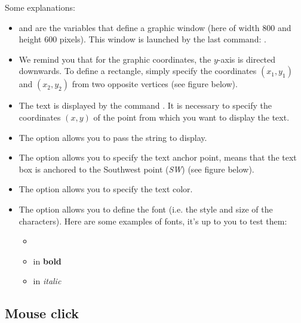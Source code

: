 \documentclass[11pt,class=report,crop=false]{standalone}
\begin{document}
Some explanations:
\begin{itemize}
  \item {} and  are the variables that define a graphic window (here of width $800$ and height $600$ pixels). This window is launched by the last command: .
  
  \item We remind you that for the graphic coordinates, the $y$-axis is directed downwards. To define a rectangle, simply specify the coordinates 
  $(x_1,y_1)$ and $(x_2,y_2)$ from two opposite vertices (see figure below). 
  
  \item The text is displayed by the command . It is necessary to specify the coordinates $(x,y)$ of the point from which you want to display the text. 
  
  \item The  option allows you to pass the string to display.
  
  \item The  option allows you to specify the text anchor point,  means that the text box is anchored to the Southwest point (\emph{SW}) (see figure below).
  
  \item The  option allows you to specify the text color.
  
  \item The option  allows you to define the font (i.e. the style and size of the characters). Here are some examples of fonts, it's up to you to test them:
  \begin{itemize}
    \item {} 
    \item {} in \textbf{bold}
    \item {} in \emph{italic}
  \end{itemize}  
\end{itemize}





\subsection{Mouse click}
\end{document}
